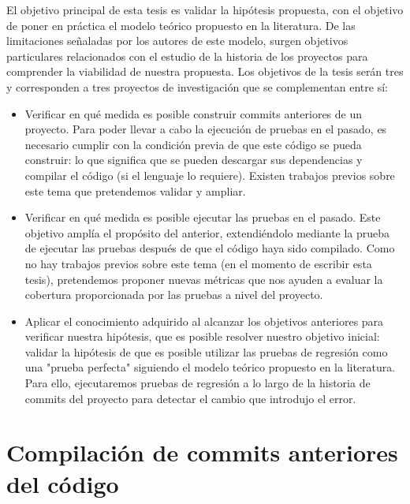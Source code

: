 El objetivo principal de esta tesis es validar la hipótesis propuesta, con el objetivo de poner en práctica el modelo teórico propuesto en la literatura. 
De las limitaciones señaladas por los autores de este modelo, surgen objetivos particulares relacionados con el estudio de la historia de los proyectos para comprender la viabilidad de nuestra propuesta. 
Los objetivos de la tesis serán tres y corresponden a tres proyectos de investigación que se complementan entre sí:
\begin{itemize}
    \item Verificar en qué medida es posible construir commits anteriores de un proyecto. Para poder llevar a cabo la ejecución de pruebas en el pasado, es necesario cumplir con la condición previa de que este código se pueda construir: lo que significa que se pueden descargar sus dependencias y compilar el código (si el lenguaje lo requiere). Existen trabajos previos sobre este tema que pretendemos validar y ampliar.
    \item Verificar en qué medida es posible ejecutar las pruebas en el pasado. Este objetivo amplía el propósito del anterior, extendiéndolo mediante la prueba de ejecutar las pruebas después de que el código haya sido compilado. Como no hay trabajos previos sobre este tema (en el momento de escribir esta tesis), pretendemos proponer nuevas métricas que nos ayuden a evaluar la cobertura proporcionada por las pruebas a nivel del proyecto.
    \item Aplicar el conocimiento adquirido al alcanzar los objetivos anteriores para verificar nuestra hipótesis, que es posible resolver nuestro objetivo inicial: validar la hipótesis de que es posible utilizar las pruebas de regresión como una "prueba perfecta" siguiendo el modelo teórico propuesto en la literatura. Para ello, ejecutaremos pruebas de regresión a lo largo de la historia de commits del proyecto para detectar el cambio que introdujo el error.
\end{itemize}

\section{Compilación de commits anteriores del código}
\label{sec:resumen:buildability}

